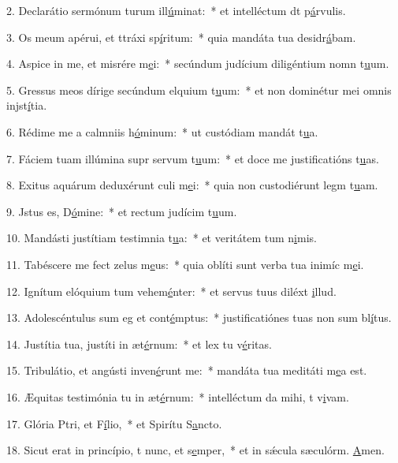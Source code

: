 2. Declarátio sermónum turum ill\uline{ú}minat:~* et intelléctum dt p\uline{á}rvulis.\par 
3. Os meum apérui, et ttráxi sp\uline{í}ritum:~* quia mandáta tua desidr\uline{á}bam.\par 
4. Aspice in me, et misrére m\uline{e}i:~* secúndum judícium diligéntium nomn t\uline{u}um.\par 
5. Gressus meos dírige secúndum elquium t\uline{u}um:~* et non dominétur mei omnis injst\uline{í}tia.\par 
6. Rédime me a calmniis h\uline{ó}minum:~* ut custódiam mandát t\uline{u}a.\par 
7. Fáciem tuam illúmina supr servum t\uline{u}um:~* et doce me justificatións t\uline{u}as.\par 
8. Exitus aquárum deduxérunt culi m\uline{e}i:~* quia non custodiérunt legm t\uline{u}am.\par 
9. Jstus es, D\uline{ó}mine:~* et rectum judícim t\uline{u}um.\par 
10. Mandásti justítiam testimnia t\uline{u}a:~* et veritátem tum n\uline{i}mis.\par 
11. Tabéscere me fect zelus m\uline{e}us:~* quia oblíti sunt verba tua inimíc m\uline{e}i.\par 
12. Ignítum elóquium tum vehem\uline{é}nter:~* et servus tuus diléxt \uline{i}llud.\par 
13. Adolescéntulus sum eg et cont\uline{é}mptus:~* justificatiónes tuas non sum bl\uline{í}tus.\par 
14. Justítia tua, justíti in æt\uline{é}rnum:~* et lex tu v\uline{é}ritas.\par 
15. Tribulátio, et angústi inven\uline{é}runt me:~* mandáta tua meditáti m\uline{e}a est.\par 
16. Æquitas testimónia tu in æt\uline{é}rnum:~* intelléctum da mihi, t v\uline{i}vam.\par 
17. Glória Ptri, et F\uline{í}lio,~* et Spirítu S\uline{a}ncto.\par 
18. Sicut erat in princípio, t nunc, et s\uline{e}mper,~* et in sǽcula sæculórm. \uline{A}men.\par 
